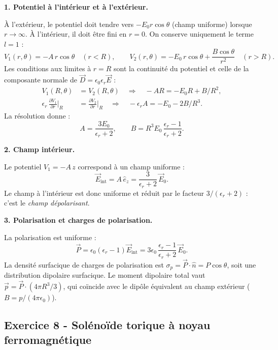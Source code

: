 \documentclass[12pt,a4paper]{article}
\begin{document}
\begin{boitecorrige}

\textbf{1. Potentiel à l'intérieur et à l'extérieur.}

À l'extérieur, le potentiel doit tendre vers $-E_0 r\cos\theta$ (champ uniforme) lorsque $r\to\infty$. À l'intérieur, il doit être fini en $r=0$. On conserve uniquement le terme $l=1$ :
\[
V_1(r,\theta) = -A\,r\cos\theta \quad (r<R),\qquad V_2(r,\theta) = -E_0\,r\cos\theta + \frac{B\cos\theta}{r^2} \quad (r>R).
\]
Les conditions aux limites à $r=R$ sont la continuité du potentiel et celle de la composante normale de $\vec{D} = \epsilon_0\epsilon_r\vec{E}$ :
\begin{align*}
V_1(R,\theta) &= V_2(R,\theta) \quad\Rightarrow\quad -AR = -E_0 R + B/R^2,\\
\epsilon_r\,\frac{\partial V_1}{\partial r}\Big|_R &= \frac{\partial V_2}{\partial r}\Big|_R \quad\Rightarrow\quad -\epsilon_r A = -E_0 - 2B/R^3.
\end{align*}
La résolution donne :
\[
A = \frac{3E_0}{\epsilon_r+2}, \qquad B = R^3 E_0\,\frac{\epsilon_r-1}{\epsilon_r+2}.
\]

\textbf{2. Champ intérieur.}

Le potentiel $V_1 = -A\,z$ correspond à un champ uniforme :
\[
\vec{E}_\text{int} = A\,\hat{e}_z = \frac{3}{\epsilon_r+2}\,\vec{E}_0.
\]
Le champ à l'intérieur est donc uniforme et réduit par le facteur $3/(\epsilon_r+2)$ : c'est le \emph{champ dépolarisant}.

\textbf{3. Polarisation et charges de polarisation.}

La polarisation est uniforme :
\[
\vec{P} = \epsilon_0(\epsilon_r-1)\vec{E}_\text{int} = 3\epsilon_0\,\frac{\epsilon_r-1}{\epsilon_r+2}\,\vec{E}_0.
\]
La densité surfacique de charges de polarisation est $\sigma_p = \vec{P}\cdot\hat{n} = P\cos\theta$, soit une distribution dipolaire surfacique. Le moment dipolaire total vaut $\vec{p} = \vec{P}\cdot(4\pi R^3/3)$, qui co\"incide avec le dipôle équivalent au champ extérieur ($B = p/(4\pi\epsilon_0)$).

\end{boitecorrige}

\subsection*{Exercice 8 - Solénoïde torique à noyau ferromagnétique \niveau{\moyen}}
\end{document}
